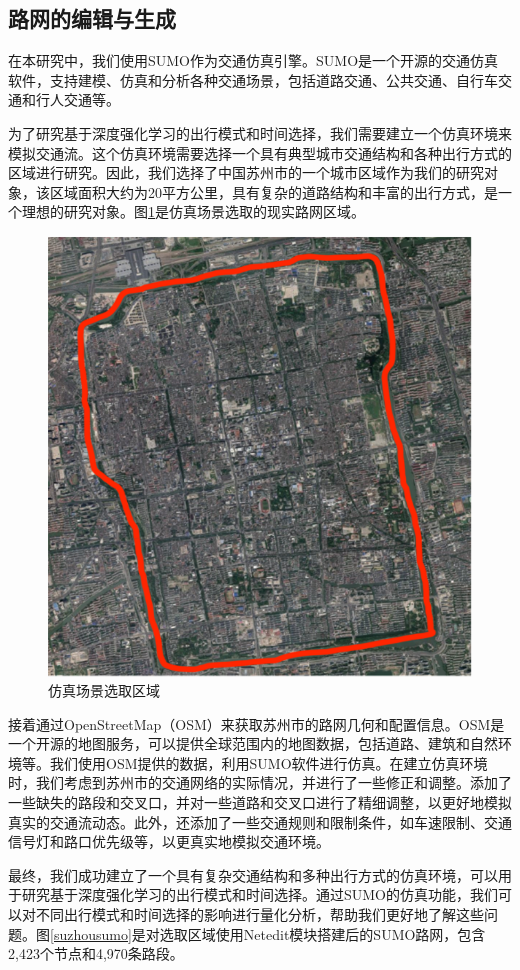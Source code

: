 \subsection{路网的编辑与生成}

在本研究中，我们使用SUMO作为交通仿真引擎。SUMO是一个开源的交通仿真软件，支持建模、仿真和分析各种交通场景，包括道路交通、公共交通、自行车交通和行人交通等。

为了研究基于深度强化学习的出行模式和时间选择，我们需要建立一个仿真环境来模拟交通流。这个仿真环境需要选择一个具有典型城市交通结构和各种出行方式的区域进行研究。因此，我们选择了中国苏州市的一个城市区域作为我们的研究对象，该区域面积大约为20平方公里，具有复杂的道路结构和丰富的出行方式，是一个理想的研究对象。图\ref{suzhounet}是仿真场景选取的现实路网区域。

\begin{figure}[htbp]
  \centering
  \includegraphics[width=.5\linewidth]{figures/content/suzhounet.png}
  \caption{仿真场景选取区域}
  \label{suzhounet}
\end{figure}

接着通过OpenStreetMap（OSM）来获取苏州市的路网几何和配置信息。OSM是一个开源的地图服务，可以提供全球范围内的地图数据，包括道路、建筑和自然环境等。我们使用OSM提供的数据，利用SUMO软件进行仿真。在建立仿真环境时，我们考虑到苏州市的交通网络的实际情况，并进行了一些修正和调整。添加了一些缺失的路段和交叉口，并对一些道路和交叉口进行了精细调整，以更好地模拟真实的交通流动态。此外，还添加了一些交通规则和限制条件，如车速限制、交通信号灯和路口优先级等，以更真实地模拟交通环境。

最终，我们成功建立了一个具有复杂交通结构和多种出行方式的仿真环境，可以用于研究基于深度强化学习的出行模式和时间选择。通过SUMO的仿真功能，我们可以对不同出行模式和时间选择的影响进行量化分析，帮助我们更好地了解这些问题。图\ref{suzhousumo}是对选取区域使用Netedit模块搭建后的SUMO路网，包含2,423个节点和4,970条路段。

